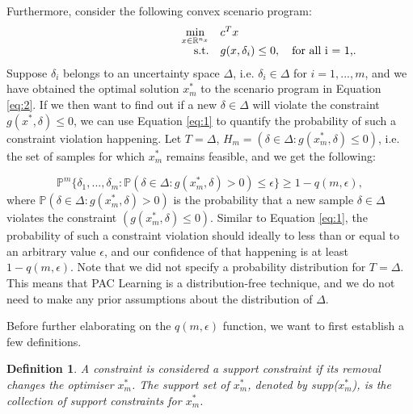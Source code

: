 \documentclass[11pt]{article}
\newtheorem{theorem}{Definition}
\begin{document}
Furthermore, consider the following convex scenario program:
\begin{equation}
	\label{eq:2}
	\begin{array}{rrclcl}
	\displaystyle \min_{x \in \mathbb{R}^{n_{x}}} & \multicolumn{3}{l}{c^{T}x}\\
	\textrm{s.t.} & g(x,\delta_{i}) \leq 0, \quad \textrm{for all i = 1,...,m}.\\
	\end{array}
	\end{equation}
Suppose $\delta_{i}$ belongs to an uncertainty space $\Delta$, i.e. $\delta_{i} \in \Delta$ for $i = 1,...,m$, and we have obtained the optimal solution $x^{*}_{m}$ to the scenario program in Equation \ref{eq:2}. If we then want to find out if a new $\delta\in \Delta$ will violate the constraint $g(x^{*},\delta) \leq 0$, we can use Equation \ref{eq:1} to quantify the probability of such a constraint violation happening. Let $T=\Delta$, $H_{m} = (\delta \in \Delta: g(x^{*}_{m},\delta) \leq 0)$, i.e. the set of samples for which $x^{*}_{m}$ remains feasible, and we get the following:

\begin{equation}
	\label{eq:3}
	\mathbb{P}^{m} \{\delta_{1},...,\delta_{m}: \mathbb{P}(\delta \in \Delta: g(x^{*}_{m},\delta) > 0) \leq \epsilon \} \geq 1 - q(m,\epsilon),
\end{equation}
where $\mathbb{P}(\delta \in \Delta: g(x^{*}_{m},\delta) > 0)$ is the probability that a new sample $\delta\in \Delta$ violates the constraint $(g(x^{*}_{m},\delta) \leq 0)$. Similar to Equation \ref{eq:1}, the probability of such a constraint violation should ideally to less than or equal to an arbitrary value $\epsilon$, and our confidence of that happening is at least $1 - q(m,\epsilon)$. Note that we did not specify a probability distribution for $T=\Delta$. This means that PAC Learning is a distribution-free technique, and we do not need to make any prior assumptions about the distribution of $\Delta$.

Before further elaborating on the $q(m,\epsilon)$ function, we want to first establish a few definitions.


\begin{theorem}
	A constraint is considered a support constraint if its removal changes the optimiser $x^{*}_{m}$. The support set of $x^{*}_{m}$, denoted by supp($x^{*}_{m}$), is the collection of support constraints for $x^{*}_{m}$.
\end{theorem}
\end{document}
